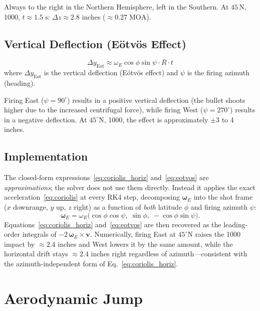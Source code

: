 \documentclass[11pt,twoside,openright]{report}
\newcommand{\vvec}{\bm{v}}
\begin{document}
Always to the right in the Northern Hemisphere, left in the Southern. At $45\,\text{N}$, \SI{1000}{\yard}, $t \approx 1.5\;\text{s}$: $\Delta z \approx 2.8$ inches ($\approx 0.27\;\text{MOA}$).

\subsection{Vertical Deflection (E\"otv\"os Effect)}

\begin{equation}
  \boxed{\Delta y_{\mathrm{Eot}} \approx \omega_E \cos\phi\sin\psi \cdot R \cdot t}
  \label{eq:eotvos}
\end{equation}
where $\Delta y_{\mathrm{Eot}}$ is the vertical deflection (E\"otv\"os effect) and $\psi$ is the firing azimuth (heading).

Firing East ($\psi = 90^{\circ}$) results in a positive vertical deflection (the bullet shoots higher due to the increased centrifugal force), while firing West ($\psi = 270^{\circ}$) results in a negative deflection. At $45^{\circ}$N, \SI{1000}{\yard}, the effect is approximately $\pm 3$ to 4 inches.

\subsection{Implementation}

The closed-form expressions~\eqref{eq:coriolis_horiz} and~\eqref{eq:eotvos} are
\emph{approximations}; the solver does not use them directly. Instead it applies
the exact acceleration~\eqref{eq:coriolis} at every RK4 step, decomposing
$\bm{\omega}_E$ into the shot frame ($x$ downrange, $y$ up, $z$ right) as a
function of \emph{both} latitude $\phi$ and firing azimuth $\psi$:
\begin{equation}
  \bm{\omega}_E = \omega_E\bigl(\cos\phi\cos\psi,\;\sin\phi,\;-\cos\phi\sin\psi\bigr).
  \label{eq:omega_shotframe}
\end{equation}
Equations~\eqref{eq:coriolis_horiz} and~\eqref{eq:eotvos} are then recovered as
the leading-order integrals of $-2\,\bm{\omega}_E\times\vvec$. Numerically, firing
East at $45^{\circ}$N raises the \SI{1000}{\yard} impact by $\approx 2.4$ inches
and West lowers it by the same amount, while the horizontal drift stays
$\approx 2.4$ inches right regardless of azimuth---consistent with the
azimuth-independent form of Eq.~\eqref{eq:coriolis_horiz}.

\section{Aerodynamic Jump}
\end{document}
